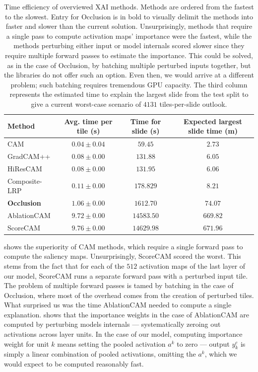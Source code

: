 \begin{table}
\centering
{}
\begin{tabular}{@{} l c c c @{}}\toprule
Method & Avg. time per tile (s) & Time for slide (s) & Expected largest slide time (m) \\ 
\midrule
CAM           & $0.04 \pm 0.04$ & $59.45$    & $2.73$ \\
GradCAM++     & $0.08 \pm 0.00$ & $131.88$   & $6.05$ \\
HiResCAM      & $0.08 \pm 0.00$ & $131.95$   & $6.06$ \\
Composite-LRP & $0.11 \pm 0.00$ & $178.829$  & $8.21$ \\
\textbf{Occlusion}     & $1.06 \pm 0.00$ & $1612.70$  & $74.07$ \\
AblationCAM   & $9.72 \pm 0.00$ & $14583.50$ & $669.82$ \\
ScoreCAM      & $9.76 \pm 0.00$ & $14629.98$ & $671.96$ \\
\bottomrule
\end{tabular}
\caption{
Time efficiency of overviewed XAI methods.
Methods are ordered from the fastest to the slowest.
Entry for Occlusion is in bold to visually delimit the methods into faster and slower than the current solution.
Unsurprisingly, methods that require a single pass to compute activation maps' importance were the fastest, while the methods perturbing either input or model internals scored slower since they require multiple forward passes to estimate the importance.
This could be solved, as in the case of Occlusion, by batching multiple perturbed inputs together, but the libraries do not offer such an option.
Even then, we would arrive at a different problem; such batching requires tremendous GPU capacity.
The third column represents the estimated time to explain the largest slide from the test split to give a current worst-case scenario of $4131$ tiles-per-slide outlook.
}
\label{tab:comp-time}
\end{table}

 shows the superiority of CAM methods, which require a single forward pass to compute the saliency maps.
Unsurprisingly, ScoreCAM scored the worst.
This stems from the fact that for each of the $512$ activation maps of the last layer of our model, ScoreCAM runs a separate forward pass with a perturbed input tile.
The problem of multiple forward passes is tamed by batching in the case of Occlusion, where most of the overhead comes from the creation of perturbed tiles.
What surprised us was the time AblationCAM needed to compute a single explanation.
 shows that the importance weights in the case of AblationCAM are computed by perturbing models internals --- systematically zeroing out activations across layer units.
In the case of our model, computing importance weight for unit $k$ means setting the pooled activation $a^k$ to zero --- output $y^c_k$ is simply a linear combination of pooled activations, omitting the $a^k$, which we would expect to be computed reasonably fast.

